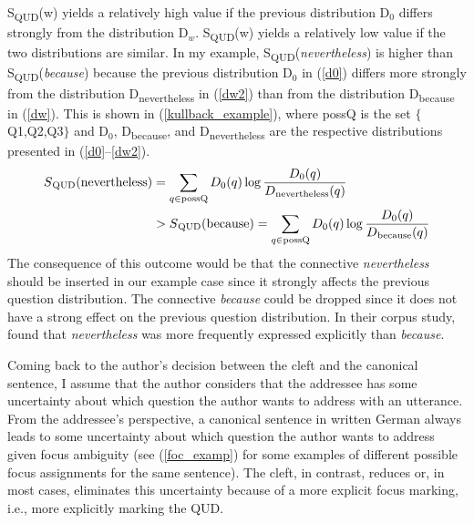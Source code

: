 \documentclass[output=paper,colorlinks,citecolor=brown]{langscibook}
\begin{document}
%
S\textsubscript{QUD}(w) yields a relatively high value if the previous distribution D$_{0}$ differs strongly from the distribution D$_{w}$. S\textsubscript{QUD}(w) yields a relatively low value if the two distributions are similar. In my example, S\textsubscript{QUD}(\textit{nevertheless}) is higher than S\textsubscript{QUD}(\textit{because}) because the previous distribution D$_{0}$ in (\ref{d0}) differs more strongly from the distribution D\textsubscript{nevertheless} in (\ref{dw2}) than from the distribution D\textsubscript{because} in (\ref{dw}). This is shown in (\ref{kullback_example}), where possQ is the set $\{$Q1,Q2,Q3$\}$ and D$_{0}$, D\textsubscript{because}, and D\textsubscript{nevertheless} are the respective distributions presented in (\ref{d0}--\ref{dw2}).
\begin{equation}
\label{kullback_example}
\begin{split}
  S\textsubscript{\text{QUD}}(\text{nevertheless}) & = \sum_{q \in \text{possQ}}D_{0}(q)\log\frac{D_{0}(q)}{D\textsubscript{\text{nevertheless}}(q)} \\ 
  & >  S\textsubscript{\text{QUD}}(\text{because}) = \sum_{q \in \text{possQ}}D_{0}(q)\log\frac{D_{0}(q)}{D\textsubscript{\text{because}}(q)}   
    \end{split}
\end{equation}
%
The consequence of this outcome would be that the connective \textit{nevertheless} should be inserted in our example case since it strongly affects the previous question distribution. The connective \textit{because} could be dropped since it does not have a strong effect on the previous question distribution. In their corpus study, \citet{asr_demberg_2015} found that \textit{nevertheless} was more frequently expressed explicitly than \textit{because}.

Coming back to the author's decision between the cleft and the canonical sentence, I assume that the author considers that the addressee has some uncertainty about which question the author wants to address with an utterance. From the addressee's perspective, a canonical sentence in written German always leads to some uncertainty about which question the author wants to address given focus ambiguity (see (\ref{foc_examp}) for some examples of different possible focus assignments for the same sentence). The cleft, in contrast, reduces or, in most cases, eliminates this uncertainty because of a more explicit focus marking, i.e., more explicitly marking the QUD.
\end{document}
